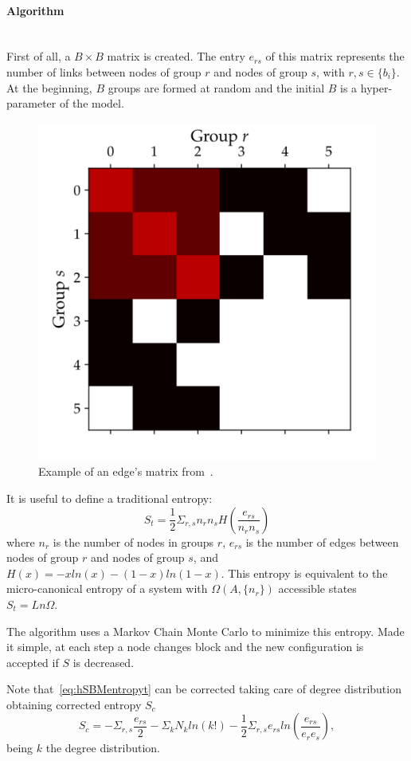 \paragraph{Algorithm}\mbox{}\\
First of all, a $B\times B$ matrix is created. The entry $e_{rs}$ of this matrix represents the number of links between nodes of group $r$ and nodes of group $s$, with $r,s\in\{b_i\}$. At the beginning, $B$ groups are formed at random and the initial $B$ is a hyper-parameter of the model.
\begin{figure}[htb!]
  \centering
  \includegraphics[width=0.3\linewidth]{pictures/topic/peixioto_ers.pdf}
  \caption{Example of an edge's matrix from~\cite{peixoto_graph-tool_2014}.}
    \label{fig:hsbm-ers}
\end{figure}

It is useful to define a traditional entropy:
\begin{equation}\label{eq:hSBMentropyt}
  S_t=\frac{1}{2}\Sigma_{r,s} n_rn_sH\left(\frac{e_{rs}}{n_rn_s}\right)
\end{equation}
where $n_{r}$ is the number of nodes in groups $r$, $e_{rs}$ is the number of edges between nodes of group $r$ and nodes of group $s$, and $H(x)=-xln(x)-(1-x)ln(1-x)$. This entropy is equivalent to the micro-canonical entropy of a system with ${\Omega(A,\{n_r\})}$ accessible states $S_t=Ln\Omega$.

The algorithm uses a Markov Chain Monte Carlo to minimize this entropy. Made it simple, at each step a node changes block and the new configuration is accepted if $S$ is decreased.

Note that~\ref{eq:hSBMentropyt} can be corrected taking care of degree distribution obtaining corrected entropy $S_c$
\begin{equation}
  S_c=-\Sigma_{r,s}\frac{e_{rs}}{2}-\Sigma_k
  N_kln(k!)-\frac{1}{2}\Sigma_{r,s}e_{rs}ln\left(\frac{e_{rs}}{e_re_s}\right),
\end{equation}
being $k$ the degree distribution.

